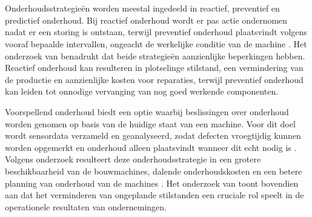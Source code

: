 \section{}%
\label{sec:Onderhoudsstrategieën}

Onderhoudsstrategieën worden meestal ingedeeld in reactief, preventief en predictief onderhoud. Bij reactief onderhoud wordt er pas actie ondernomen nadat er een storing is ontstaan, terwijl preventief onderhoud plaatsvindt volgens vooraf bepaalde intervallen, ongeacht de werkelijke conditie van de machine \autocite{Mikulic2024, Morganti2024}. Het onderzoek van \textcite{Deepak2025} benadrukt dat beide strategieën aanzienlijke beperkingen hebben. Reactief onderhoud kan resulteren in plotselinge stilstand, een vermindering van de productie en aanzienlijke kosten voor reparaties, terwijl preventief onderhoud kan leiden tot onnodige vervanging van nog goed werkende componenten.


Voorspellend onderhoud biedt een optie waarbij beslissingen over onderhoud worden genomen op basis van de huidige staat van een machine. Voor dit doel wordt sensordata verzameld en geanalyseerd, zodat defecten vroegtijdig kunnen worden opgemerkt en onderhoud alleen plaatsvindt wanneer dit echt nodig is \autocite{Carvalho2019}. Volgens onderzoek resulteert deze onderhoudsstrategie in een grotere beschikbaarheid van de bouwmachines, dalende onderhoudskosten en een betere planning van onderhoud van de machines \autocite{ErRatby2025, Mahale2025}. Het onderzoek van \textcite{Mahfoud2025} toont bovendien aan dat het verminderen van ongeplande stilstanden een cruciale rol speelt in de operationele resultaten van ondernemingen.



